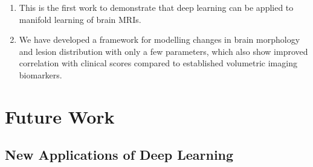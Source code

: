 \begin{enumerate}

\item This is the first work to demonstrate that deep learning can be applied to
manifold learning of brain MRIs.

\item We have developed a framework for modelling changes in brain morphology
and lesion distribution with only a few parameters, which also show improved
correlation with clinical scores compared to established volumetric imaging
biomarkers.

\end{enumerate}

\section[Future work]{Future Work}

\subsection[New applications of deep learning]{New Applications of Deep
Learning}

